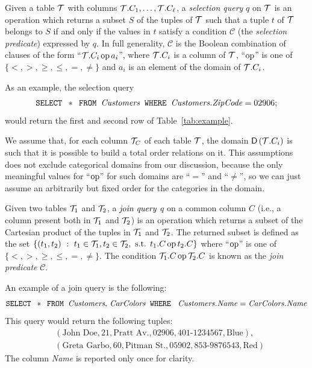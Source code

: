 \begin{definition}\label{def:selectquery}
  Given a table ${\cal T}$ with columns ${\cal T}.C_1,\dotsc,{\cal T}.C_\ell$, a
  \emph{selection query} $q$ on ${\cal T}$ is an operation which returns a subset
  $S$ of the tuples of ${\cal T}$ such that a tuple $t$ of ${\cal T}$ belongs to $S$ if
  and only if the values in $t$ satisfy a condition $\mathcal{C}$
  (the \emph{selection predicate}) expressed by $q$. In full
  generality, $\mathcal{C}$ is the Boolean combination of clauses of the form
  ``${\cal T}.C_i \operatorname{op} a_i$'', where ${\cal T}.C_i$ is a column of ${\cal T}$, ``$\operatorname{op}$'' is one
  of $\{<,>,\ge,\le,=,\neq\}$ and $a_i$ is an element of the domain of
  ${\cal T}.C_i$.
\end{definition}

As an example, the selection query 
\[
\mbox{\texttt{SELECT }} * \mbox{\texttt{ FROM }} \mbox{\emph{Customers}} \mbox{\texttt{ WHERE }} \mbox{\emph{Customers.ZipCode}} = 02906;
\]
would return the first and second row of Table~\ref{tab:example}.

We assume that, for each column ${\cal T}_C$ of each table ${\cal T}$, the domain
$\mathsf{D}\left({\cal T}.C_i\right)$ is such that it is possible to build a total order relations
on it. This assumptions does not exclude categorical domains from our
discussion, because the only meaningful values for ``$\operatorname{op}$'' for such domains
are ``$=$'' and ``$\neq$'', so we can just assume an arbitrarily but fixed order
for the categories in the domain.

\begin{definition}\label{def:joinquery}
  Given two tables ${\cal T}_1$ and ${\cal T}_2$, a $\emph{join query}$ $q$ on a common
  column $C$ (i.e., a column present both in ${\cal T}_1$ and ${\cal T}_2$) is an
  operation which returns a subset of the Cartesian product of the tuples in
  ${\cal T}_1$ and ${\cal T}_2$. The returned subset is defined as the set $ \{(t_1,t_2)
  ~:~ t_1\in{\cal T}_1, t_2\in{\cal T}_2, \mbox{ s.t. } t_1.C \operatorname{op} t_2.C \}$ where
  ``$\operatorname{op}$'' is one of $\{<,>,\ge,\le,=,\neq\}$.
  The condition ${\cal T}_1.C \operatorname{op} {\cal T}_2.C$ is known as the \emph{join predicate}
  $\mathcal{C}$.
\end{definition}
An example of a join query is the following:
\[
\mbox{\texttt{SELECT }} * \mbox{\texttt{ FROM }} \mbox{\emph{Customers}, \emph{CarColors}} \mbox{\texttt{ WHERE }} \mbox{ 
\emph{Customers.Name}} = \mbox{\emph{CarColors.Name}}
\]
This query would return the following tuples:
\begin{align*}
  &(\mbox{John Doe}, 21, \mbox{Pratt Av.}, \mbox{02906}, \mbox{401-1234567}, \mbox{Blue}), \\
  &(\mbox{Greta Garbo}, 60, \mbox{Pitman St.}, \mbox{05902}, \mbox{853-9876543}, \mbox{Red})
\end{align*}
The column \emph{Name} is reported only once for clarity.

